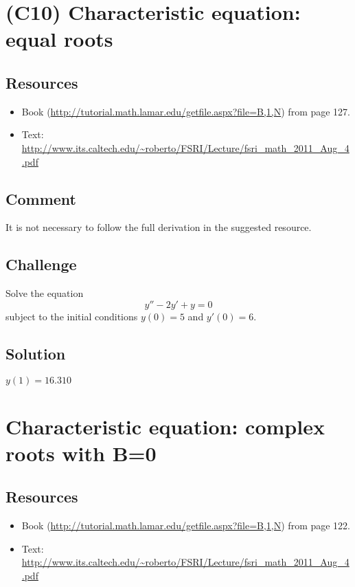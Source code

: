 \section{(C10) Characteristic equation: equal roots}

\subsection*{Resources}
\begin{itemize}
    \item Book (\url{http://tutorial.math.lamar.edu/getfile.aspx?file=B,1,N}) from page 127.
    \item Text: \url{http://www.its.caltech.edu/~roberto/FSRI/Lecture/fsri_math_2011_Aug_4.pdf}
\end{itemize}

\subsection*{Comment}
It is not necessary to follow the full derivation in the suggested resource.

\subsection*{Challenge}
Solve the equation
\begin{equation}
    y'' - 2y' + y = 0
\end{equation}
subject to the initial conditions $y(0)=5$ and $y'(0)=6$.

\subsection*{Solution}
$y(1)=16.310$



\iffalse
\newpage
\section{Characteristic equation: complex roots with B=0}

\subsection*{Resources}
\begin{itemize}
    \item Book (\url{http://tutorial.math.lamar.edu/getfile.aspx?file=B,1,N}) from page 122.
    \item Text: \url{http://www.its.caltech.edu/~roberto/FSRI/Lecture/fsri_math_2011_Aug_4.pdf}
\end{itemize}

